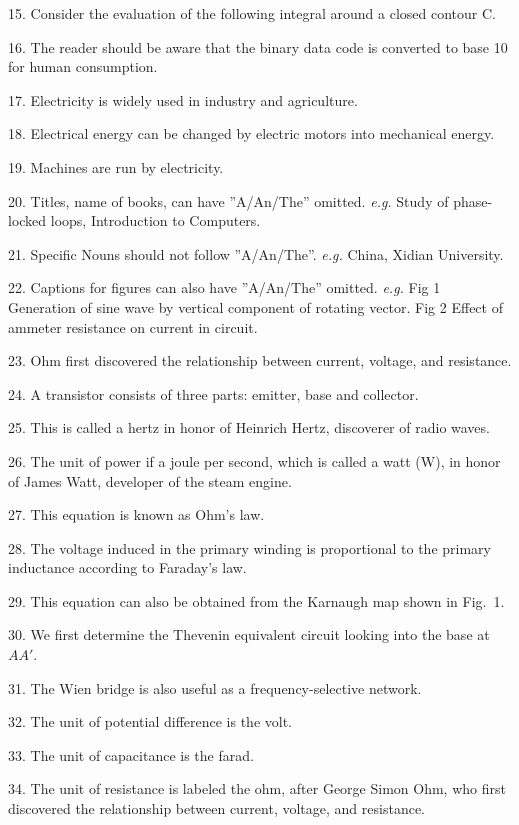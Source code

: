 \documentclass[a4paper,twocolumn,10pt]{article}
\begin{document}
\begin{CJK}{UTF8}{gkai}
	15. Consider the evaluation of the following integral around a closed contour C.

	16. The reader should be aware that the binary data code is converted to base 10
	for human consumption.

	17. Electricity is widely used in industry and agriculture.

	18. Electrical energy can be changed by electric motors into mechanical energy.

	19. Machines are run by electricity.

	20. Titles, name of books, can have ''A/An/The'' omitted. \emph{e.g.} Study of
	phase-locked loops, Introduction to Computers.

	21. Specific Nouns should not follow ''A/An/The''. \emph{e.g.} China, Xidian
	University.

	22. Captions for figures can also have ''A/An/The'' omitted. \emph{e.g.}
	Fig 1 Generation of sine wave by vertical component of rotating vector.
	Fig 2 Effect of ammeter resistance on current in circuit.

	23. Ohm first discovered the relationship between current, voltage, and resistance.

	24. A transistor consists of three parts: emitter, base and collector.

	25. This is called a hertz in honor of Heinrich Hertz, discoverer of radio waves.

	26. The unit of power if a joule per second, which is called a watt (W), in honor
	of James Watt, developer of the steam engine.

	27. This equation is known as Ohm's law.

	28. The voltage induced in the primary winding is proportional to the primary
	inductance according to Faraday's law.

	29. This equation can also be obtained from the Karnaugh map shown in Fig.~1.

	30. We first determine the Thevenin equivalent circuit looking into the base at $AA'$.

	31. The Wien bridge is also useful as a frequency-selective network.

	32. The unit of potential difference is the volt.

	33. The unit of capacitance is the farad.

	34. The unit of resistance is labeled the ohm, after George Simon Ohm, who first
	discovered the relationship between current, voltage, and resistance.


\end{CJK}
\end{document}
